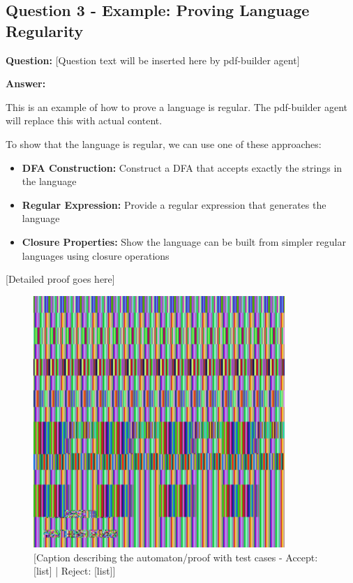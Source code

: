 \documentclass[12pt]{article}
\begin{document}

\subsection{Question 3 - Example: Proving Language Regularity}
\textbf{Question:} [Question text will be inserted here by pdf-builder agent]

\textbf{Answer:}

This is an example of how to prove a language is regular. The pdf-builder agent will replace this with actual content.

To show that the language is regular, we can use one of these approaches:
\begin{itemize}
\item \textbf{DFA Construction:} Construct a DFA that accepts exactly the strings in the language
\item \textbf{Regular Expression:} Provide a regular expression that generates the language
\item \textbf{Closure Properties:} Show the language can be built from simpler regular languages using closure operations
\end{itemize}

[Detailed proof goes here]

\begin{figure}[H]
\centering
\includegraphics[width=0.85\textwidth]{images/placeholder_q3.png}
\caption{[Caption describing the automaton/proof with test cases - Accept: [list] | Reject: [list]]}
\label{fig:question_Y}
\end{figure}
\end{document}
